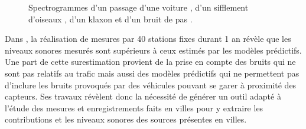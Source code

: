 \begin{figure}[t]
\centering
{}
\caption{Spectrogrammes d'un passage d'une voiture , d'un sifflement d'oiseaux , d'un klaxon  et d'un bruit de pas .}
\label{fig:sourceUrbain}
\end{figure}


Dans \cite{Mioduszewski}, la réalisation de mesures par 40 stations fixes durant 1 an révèle que les niveaux sonores mesurés sont supérieurs à ceux estimés par les modèles prédictifs. Une part de cette surestimation provient de la prise en compte des bruits qui ne sont pas relatifs au trafic  mais aussi des modèles prédictifs qui ne permettent pas d'inclure les bruits provoqués par des véhicules pouvant se garer à proximité des capteurs. Ses travaux révèlent donc la nécessité de générer un outil adapté à l'étude des mesures et enregistrements faits en villes pour y extraire les contributions et les niveaux sonores des sources présentes en villes.\\

